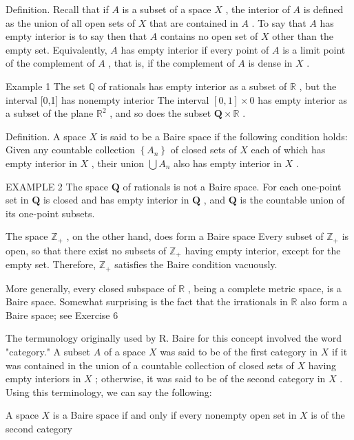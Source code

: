 \documentclass[10pt]{article}
\begin{document}
Definition. Recall that if \(A\) is a subset of a space \(X\) , the interior of \(A\) is defined as the union of all open sets of \(X\) that are contained in \(A\) . To say that \(A\) has empty interior is to say then that \(A\) contains no open set of \(X\) other than the empty set. Equivalently, \(A\) has empty interior if every point of \(A\) is a limit point of the complement of \(A\) , that is, if the complement of \(A\) is dense in \(X\) .

Example 1 The set \(\mathbb{Q}\) of rationals has empty interior as a subset of \(\mathbb{R}\) , but the interval [0,1] has nonempty interior The interval \(\left\lbrack  {0,1}\right\rbrack   \times  0\) has empty interior as a subset of the plane \({\mathbb{R}}^{2}\) , and so does the subset \(\mathbf{Q} \times  \mathbb{R}\) .

Definition. A space \(X\) is said to be a Baire space if the following condition holds: Given any countable collection \(\left\{  {A}_{n}\right\}\) of closed sets of \(X\) each of which has empty interior in \(X\) , their union \(\bigcup {A}_{n}\) also has empty interior in \(X\) .

EXAMPLE 2 The space \(\mathbf{Q}\) of rationals is not a Baire space. For each one-point set in \(\mathbf{Q}\) is closed and has empty interior in \(\mathbf{Q}\) , and \(\mathbf{Q}\) is the countable union of its one-point subsets.

The space \({\mathbb{Z}}_{ + }\) , on the other hand, does form a Baire space Every subset of \({\mathbb{Z}}_{ + }\) is open, so that there exist no subsets of \({\mathbb{Z}}_{ + }\) having empty interior, except for the empty set. Therefore, \({\mathbb{Z}}_{ + }\) satisfies the Baire condition vacuously.

More generally, every closed subspace of \(\mathbb{R}\) , being a complete metric space, is a Baire space. Somewhat surprising is the fact that the irrationals in \(\mathbb{R}\) also form a Baire space; see Exercise 6

The termunology originally used by R. Baire for this concept involved the word "category." A subset \(A\) of a space \(X\) was said to be of the first category in \(X\) if it was contained in the union of a countable collection of closed sets of \(X\) having empty interiors in \(X\) ; otherwise, it was said to be of the second category in \(X\) . Using this terminology, we can say the following:

A space \(X\) is a Baire space if and only if every nonempty open set in \(X\) is of the second category
\end{document}
